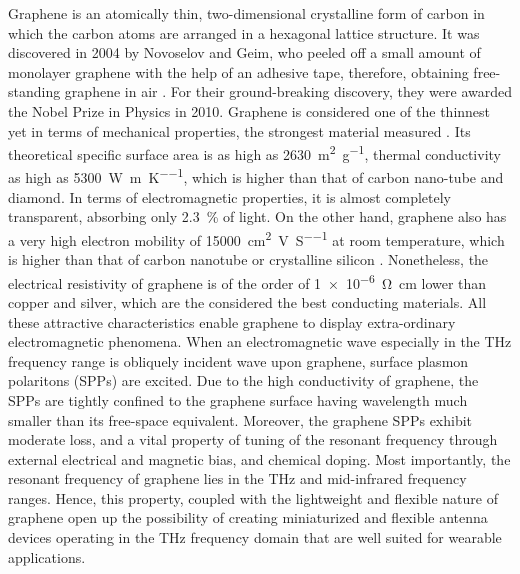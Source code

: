 \documentclass[12pt]{suhbook}
\begin{document}
Graphene is an atomically thin, two-dimensional crystalline form of carbon in which the carbon atoms are arranged in a hexagonal lattice structure. It was discovered in 2004 by Novoselov and Geim, who peeled off a small amount of monolayer graphene with the help of an adhesive tape, therefore, obtaining free-standing graphene in air \cite{novoselov2004electric}. For their ground-breaking discovery, they were awarded the Nobel Prize in Physics in 2010. Graphene is considered one of the thinnest yet in terms of mechanical properties, the strongest material measured  \cite{campos2008bulk,lee2013high}. Its theoretical specific surface area is as high as \SI{2630}{\square\m\per\gram}, thermal conductivity as high as \SI{5300}{\W \per \m \per \K}, which is higher than that of carbon nano-tube and diamond. In terms of electromagnetic properties, it is almost completely transparent, absorbing only \SI{2.3}{\percent} of light. On the other hand, graphene also has a very high electron mobility of \SI{15000}{\square \cm \per\V \per \siemens} at room temperature, which is higher than that of carbon nanotube or crystalline silicon \cite{ju2011graphene}. Nonetheless, the electrical resistivity of graphene is of the order of \SI{1e-6}{\ohm \cm} lower than copper and silver, which are the considered the best conducting materials. All these attractive characteristics enable graphene to display extra-ordinary electromagnetic phenomena. When an electromagnetic wave especially in the THz frequency range is obliquely incident wave upon graphene, surface plasmon polaritons (SPPs) are excited. Due to the high conductivity of graphene, the SPPs are tightly confined to the graphene surface having wavelength much smaller than its free-space equivalent. Moreover, the graphene SPPs exhibit moderate loss, and a vital property of tuning of the resonant frequency through external electrical and magnetic bias, and chemical doping. Most importantly, the resonant frequency of graphene lies in the THz and mid-infrared frequency ranges. Hence, this property, coupled with the lightweight and flexible nature of graphene open up the possibility of creating miniaturized and flexible antenna devices operating in the THz frequency domain that are well suited for wearable applications.
\end{document}
